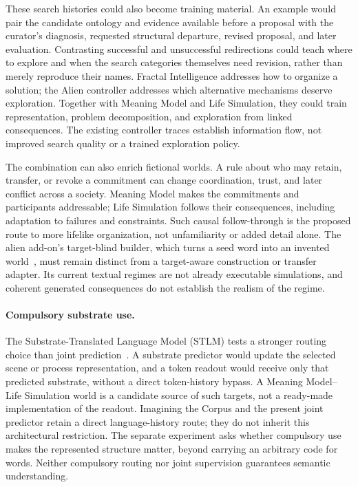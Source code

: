 \documentclass[10pt]{article}
\begin{document}
These search histories could also become training material. An example would
pair the candidate ontology and evidence available before a proposal with the
curator's diagnosis, requested structural departure, revised proposal, and
later evaluation. Contrasting successful and unsuccessful redirections could
teach where to explore and when the search categories themselves need revision,
rather than merely reproduce their names. Fractal Intelligence addresses how
to organize a solution; the Alien controller addresses which alternative
mechanisms deserve exploration. Together with Meaning Model and Life
Simulation, they could train representation, problem decomposition, and
exploration from linked consequences. The existing controller traces establish
information flow, not improved search quality or a trained exploration policy.

The combination can also enrich fictional worlds. A rule about who may retain,
transfer, or revoke a commitment can change coordination, trust, and later
conflict across a society. Meaning Model makes the commitments and participants
addressable; Life Simulation follows their consequences, including adaptation
to failures and constraints. Such causal follow-through is the proposed route
to more lifelike organization, not unfamiliarity or added detail alone.
The alien add-on's target-blind builder, which turns a seed word into an invented
world~\cite{westerbergMeaning2026}, must remain distinct from a
target-aware construction or transfer adapter. Its current textual regimes
are not already executable simulations, and coherent generated consequences
do not establish the realism of the regime.

\paragraph{Compulsory substrate use.}
The Substrate-Translated Language Model (STLM) tests a stronger routing choice than joint
prediction~\cite{westerbergSTLM2026}. A substrate predictor would update the
selected scene or process representation, and a token readout would receive
only that predicted substrate, without a direct token-history bypass. A
Meaning Model--Life Simulation world is a candidate source of such targets,
not a ready-made implementation of the readout. Imagining the Corpus and the
present joint predictor retain a direct language-history route; they do not
inherit this architectural restriction. The separate experiment asks whether
compulsory use makes the represented structure matter, beyond carrying an
arbitrary code for words. Neither compulsory routing nor joint supervision
guarantees semantic understanding.
\end{document}
